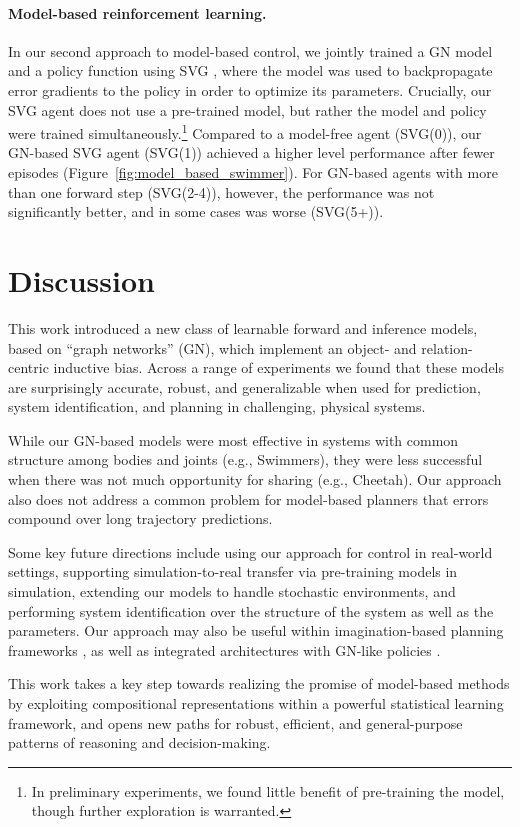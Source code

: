 \documentclass{article}
\begin{document}
\paragraph{Model-based reinforcement learning.}
In our second approach to model-based control, we jointly trained a GN model and a policy function using SVG \cite{heess2015learning}, where the model was used to backpropagate error gradients to the policy in order to optimize its parameters.
%
Crucially, our SVG agent does not use a pre-trained model, but rather the model and policy were trained simultaneously.\footnote{In preliminary experiments, we found little benefit of pre-training the model, though further exploration is warranted.}
%
Compared to a model-free agent (SVG(0)), our GN-based SVG agent (SVG(1)) achieved a higher level performance after fewer episodes (Figure~\ref{fig:model_based_swimmer}). For GN-based agents with more than one forward step (SVG(2-4)), however, the performance was not significantly better, and in some cases was worse (SVG(5+)).





\section{Discussion}

This work introduced a new class of learnable forward and inference models, based on ``graph networks'' (GN), which implement an object- and relation-centric inductive bias. Across a range of experiments we found that these models are surprisingly accurate, robust, and generalizable when used for prediction, system identification, and planning in challenging, physical systems.

While our GN-based models were most effective in systems with common structure among bodies and joints (e.g., Swimmers), they were less successful when there was not much opportunity for sharing (e.g., Cheetah). Our approach also does not address a common problem for model-based planners that errors compound over long trajectory predictions.

Some key future directions include using our approach for control in real-world settings, supporting simulation-to-real transfer via pre-training models in simulation, extending our models to handle stochastic environments, and performing system identification over the structure of the system as well as the parameters.
%
Our approach may also be useful within imagination-based planning frameworks \cite{hamrick2017metacontrol,pascanu2017learning}, as well as integrated architectures with GN-like policies \cite{wang2018nervenet}.

This work takes a key step towards realizing the promise of model-based methods by exploiting compositional representations within a powerful statistical learning framework, and opens new paths for robust, efficient, and general-purpose patterns of reasoning and decision-making.




\appendix
{}
\onecolumn

\end{document}
